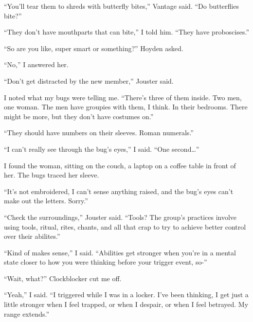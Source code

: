 ``You'll tear them to shreds with butterfly bites,'' Vantage said.  ``Do butterflies bite?''



``They don't have mouthparts that can bite,'' I told him.  ``They have proboscises.''



``So are you like, super smart or something?'' Hoyden asked.



``No,'' I answered her.



``Don't get distracted by the new member,'' Jouster said.



I noted what my bugs were telling me.  ``There's three of them inside.  Two men, one woman.  The men have groupies with them, I think.  In their bedrooms.  There might be more, but they don't have costumes on.''



``They should have numbers on their sleeves.  Roman numerals.''



``I can't really see through the bug's eyes,'' I said.  ``One second\ldots''



I found the woman, sitting on the couch, a laptop on a coffee table in front of her.  The bugs traced her sleeve.



``It's not embroidered, I can't sense anything raised, and the bug's eyes can't make out the letters.  Sorry.''



``Check the surroundings,'' Jouster said.  ``Tools?  The group's practices involve using tools, ritual, rites, chants, and all that crap to try to achieve better control over their abilites.''



``Kind of makes sense,'' I said.  ``Abilities get stronger when you're in a mental state closer to how you were thinking before your trigger event, so-''



``Wait, what?''  Clockblocker cut me off.



``Yeah,'' I said.  ``I triggered while I was in a locker.  I've been thinking, I get just a little stronger when I feel trapped, or when I despair, or when I feel betrayed.  My range extends.''



